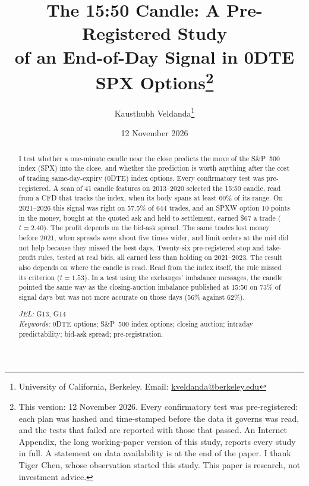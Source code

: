 \documentclass[12pt,letterpaper]{article}
\newif\ifblind
\begin{document}
\ifblind
\title{\textbf{The 15:50 Candle: A Pre-Registered Study\\of an End-of-Day Signal in 0DTE SPX Options}\thanks{This version: 12 November 2026.
Every confirmatory test was pre-registered: each plan was hashed and time-stamped
before the data it governs was read, and the tests that failed are reported with
those that passed. An Internet Appendix reports every study in full. A statement
on data availability is at the end of the paper. This paper is research, not
investment advice.}}
\author{Anonymous for review}
\else
\title{\textbf{The 15:50 Candle: A Pre-Registered Study\\of an End-of-Day Signal in 0DTE SPX Options}\thanks{This version: 12 November 2026.
Every confirmatory test was pre-registered: each plan was hashed and time-stamped
before the data it governs was read, and the tests that failed are reported with
those that passed. An Internet Appendix, the long working-paper version of this
study, reports every study in full. A statement on data availability is at the
end of the paper. I thank Tiger Chen, whose observation started this study.
This paper is research, not investment advice.}}
\author{Kausthubh Veldanda\thanks{University of California, Berkeley. Email: \href{mailto:kveldanda@berkeley.edu}{kveldanda@berkeley.edu}}}
\fi
\date{12 November 2026}
\maketitle

\begin{abstract}
\noindent I test whether a one-minute candle near the close predicts the move of the
S\&P~500 index (SPX) into the close, and whether the prediction is worth
anything after the cost of trading same-day-expiry (0DTE) index options. Every confirmatory test was
pre-registered. A scan of 41 candle features on 2013--2020 selected the 15:50 candle, read from a CFD that tracks the index, when its body
spans at least 60\% of its range. On 2021--2026 this signal was right on 57.5\%
of 644 trades, and an SPXW option 10 points in the money, bought at the quoted
ask and held to settlement, earned \$67 a trade ($t = 2.40$). The profit
depends on the bid-ask spread. The same trades lost money before 2021, when spreads
were about five times wider, and limit orders at the mid did not help because they
missed the best days. Twenty-six pre-registered stop and take-profit rules, tested
at real bids, all earned less than holding on 2021--2023. The result also depends on where the candle is read. Read from the index
itself, the
rule missed its criterion ($t = 1.53$). In a test using the exchanges'
imbalance messages, the candle
pointed the same way as the closing-auction imbalance published at 15:50 on 73\%
of signal days but was not more accurate on those days (56\% against 62\%).

\medskip
\noindent \textit{JEL:} G13, G14\\
\noindent \textit{Keywords:} 0DTE options; S\&P~500 index options; closing
auction; intraday predictability; bid-ask spread; pre-registration.
\end{abstract}
\end{document}
